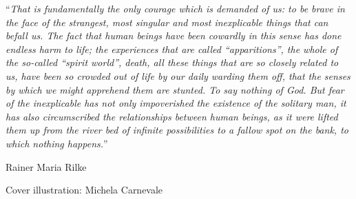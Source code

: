 
\vspace*{0.2\textheight}

\noindent\enquote{\itshape That is fundamentally the only courage which is demanded of us: to be brave in the face of the strangest, most singular and most inexplicable things that can befall us. The fact that human beings have been cowardly in this sense has done endless harm to life; the experiences that are called “apparitions”, the whole of the so-called “spirit world”, death, all these things that are so closely related to us, have been so crowded out of life by our daily warding them off, that the senses by which we might apprehend them are stunted. To say nothing of God. But fear of the inexplicable has not only impoverished the existence of the solitary man, it has also circumscribed the relationships between human beings, as it were lifted them up from the river bed of infinite possibilities to a fallow spot on the bank, to which nothing happens.}\bigbreak

\hfill Rainer Maria Rilke

\vspace{20cm}
Cover illustration: Michela Carnevale


